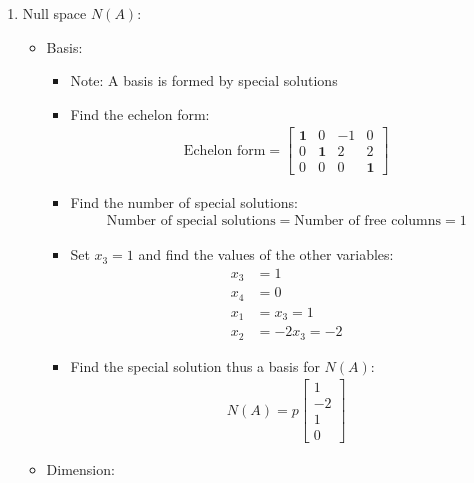\documentclass[10pt,a4paper]{article}
\begin{document}
\begin{enumerate}
\begin{itemize}
\begin{itemize}
        \end{itemize}
    \end{itemize}
    \item Null space $N(A)$:
    \begin{itemize}
        \item Basis:
        \begin{itemize}
            \item Note: A basis is formed by special solutions
            \item Find the echelon form:
            \begin{align*}
                \text{Echelon form} = 
                \begin{bmatrix}
                    \textbf{1}&0&-1&0 \\
                    0&\textbf{1}&2&2 \\
                    0&0&0&\textbf{1}
                \end{bmatrix}
            \end{align*}
            \item Find the number of special solutions:
            \begin{align*}
                \text{Number of special solutions}=\text{Number of free columns}=1
            \end{align*}
            \item Set $x_3 = 1$ and find the values of the other variables:
            \begin{align*}
                x_3 &= 1 \\
                x_4 &= 0 \\
                x_1 &= x_3 = 1 \\
                x_2 &= -2x_3 = -2
            \end{align*}
            \item Find the special solution thus a basis for $N(A)$:
            \begin{align*}
                N(A) = p
                \begin{bmatrix}
                    1 \\
                    -2 \\
                    1 \\
                    0
                \end{bmatrix}
            \end{align*}
        \end{itemize}
        \item Dimension:

\end{itemize}
\end{enumerate}
\end{document}
